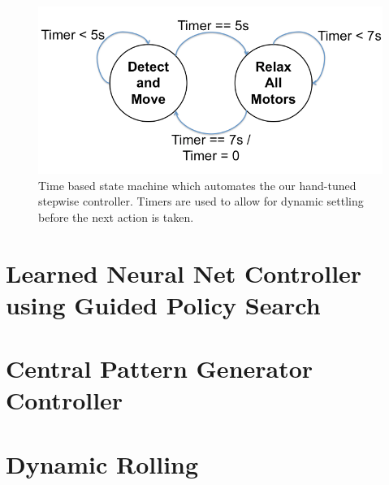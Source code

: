 \label{hand_stepwise}
\begin{figure}[thpb]
      \centering
      \includegraphics[width=0.7\columnwidth]{tex/img/Stepwise_state_machine/Slide1_fixed}
      \caption{Time based state machine which automates the our hand-tuned stepwise controller. Timers are used to allow for dynamic settling before the next action is taken.}
      \label{fig:stepwise_fsm}
\end{figure}

\section{Learned Neural Net Controller using Guided Policy Search}
\label{learned_controllers}


\section{Central Pattern Generator Controller}
\label{cpg_controller}

\section{Dynamic Rolling}
\label{dyncamic_rolling}